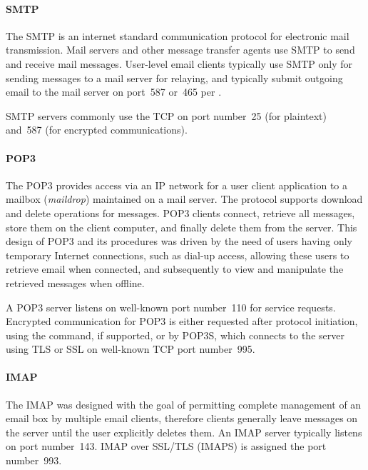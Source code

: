 \paragraph{\acs{SMTP}}
The \acl{SMTP} is an internet standard communication protocol for electronic mail transmission.
Mail servers and other message transfer agents use \acs{SMTP} to send and receive mail messages.
User-level email clients typically use \acs{SMTP} only for sending messages to a mail server for relaying, and typically submit outgoing email to the mail server on port~587 or~465 per .

\acs{SMTP} servers commonly use the \acf{TCP} on port number~25 (for plaintext) and~587 (for encrypted communications).


\paragraph{\acs{POP3}}
The \acl{POP3} provides access via an \acs{IP} network for a user client application to a mailbox (\emph{maildrop}) maintained on a mail server.
The protocol supports download and delete operations for messages.
\acs{POP3} clients connect, retrieve all messages, store them on the client computer, and finally delete them from the server.
This design of \acs{POP3} and its procedures was driven by the need of users having only temporary Internet connections, such as dial-up access, allowing these users to retrieve email when connected, and subsequently to view and manipulate the retrieved messages when offline.

A \acs{POP3} server listens on well-known port number~110 for service requests.
Encrypted communication for \acs{POP3} is either requested after protocol initiation, using the  command, if supported, or by \acs{POP3S}, which connects to the server using \acs{TLS} or \acs{SSL} on well-known \acs{TCP} port number~995.


\paragraph{\acs{IMAP}}
The \acl{IMAP} was designed with the goal of permitting complete management of an email box by multiple email clients, therefore clients generally leave messages on the server until the user explicitly deletes them.
An \acs{IMAP} server typically listens on port number~143.
\acs{IMAP} over \acs{SSL}/\acs{TLS} (\acs{IMAPS}) is assigned the port number~993.

